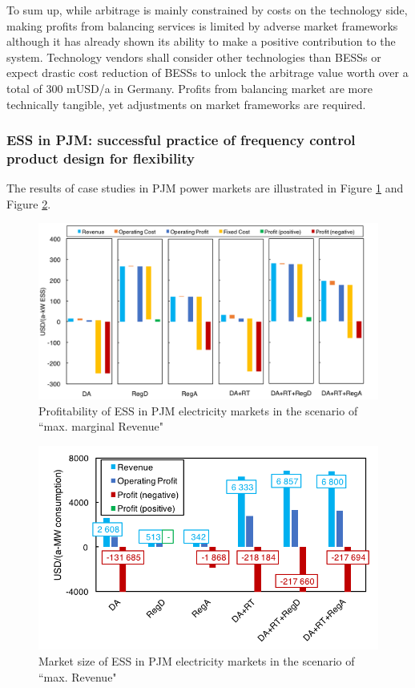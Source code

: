 To sum up, while arbitrage is mainly constrained by costs on the technology side, making profits from balancing services is limited by adverse market frameworks although it has already shown its ability to make a positive contribution to the system. Technology vendors shall consider other technologies than BESSs or expect drastic cost reduction of BESSs to unlock the arbitrage value worth over a total of 300 mUSD/a in Germany. Profits from balancing market are more technically tangible, yet adjustments on market frameworks are required.

\subsubsection{ESS in PJM: successful practice of frequency control product design for flexibility}
The results of case studies in PJM power markets are illustrated in Figure \ref{fig:pjm-ess-profitability} and Figure \ref{fig:pjm-ess}.

\begin{figure}[h!]
	\centering
	\includegraphics[width=0.9\linewidth]{Figures/PJM_ESS_profitability}
	\caption{Profitability of ESS in PJM electricity markets in the scenario of ``max. marginal Revenue"}
	\label{fig:pjm-ess-profitability}
\end{figure}

\begin{figure}[h!]
	\centering
	\includegraphics[width=0.9\linewidth]{Figures/PJM_ESS}
	\caption{Market size of ESS in PJM electricity markets in the scenario of ``max. Revenue"}
	\label{fig:pjm-ess}
\end{figure}

